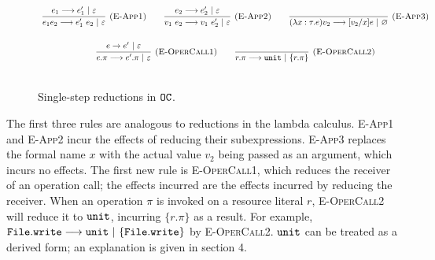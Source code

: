 \begin{figure}[h]

\noindent
{}

\[
\begin{array}{c}

\infer[\textsc{(E-App1)}]
	{e_1 e_2 \longrightarrow e_1'~ e_2~|~\varepsilon}
	{e_1 \longrightarrow e_1'~|~\varepsilon}
    
	\hspace{5ex}
    
\infer[\textsc{(E-App2)}]
	{v_1 ~ e_2 \longrightarrow v_1 ~ e_2'~|~\varepsilon} 
	{e_2 \longrightarrow e_2'~|~\varepsilon}
    
	\hspace{5ex}
    
\infer[\textsc{(E-App3)}]
	{ (\lambda x: \tau. e) v_2 \longrightarrow [ v_2/x] e~|~\varnothing }
	{}\\[4ex]
	
\infer[\textsc{(E-OperCall1)}]
	{ e.\pi \longrightarrow  e'.\pi~|~\varepsilon }
	{ e \rightarrow  e'~|~\varepsilon}
		
	\hspace{5ex}
	
\infer[\textsc{(E-OperCall2)}]
	{r.\pi \longrightarrow \kwa{unit}~|~\{ r.\pi \} }
	{}
	 \\[4ex]
	 
\end{array}
\]


\vspace{-7pt}
\caption{Single-step reductions in $\mathtt{OC}$.}
\label{fig:opercalc_singlestep}
\end{figure}

The first three rules are analogous to reductions in the lambda calculus. \textsc{E-App1} and \textsc{E-App2} incur the effects of reducing their subexpressions. \textsc{E-App3} replaces the formal name $x$ with the actual value $v_2$ being passed as an argument, which incurs no effects. The first new rule is \textsc{E-OperCall1}, which reduces the receiver of an operation call; the effects incurred are the effects incurred by reducing the receiver. 
When an operation $\pi$ is invoked on a resource literal $r$, \textsc{E-OperCall2} will reduce it to $\mathtt{unit}$,
incurring $\{ r.\pi \}$ as a result. For example, $\mathtt{File.write} \longrightarrow \mathtt{unit}~|~\{ \mathtt{File.write} \}$ by \textsc{E-OperCall2}. $\mathtt{unit}$ can be treated as a derived form; an explanation is given in section 4.


